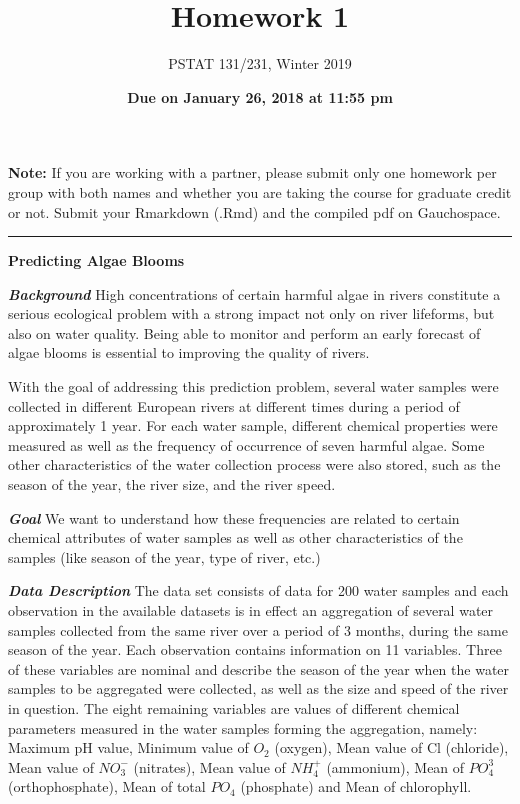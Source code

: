 \documentclass[]{article}
\title{Homework 1}
\author{PSTAT 131/231, Winter 2019}
\date{\textbf{Due on January 26, 2018 at 11:55 pm}}
\begin{document}
\maketitle

\textbf{Note:} If you are working with a partner, please submit only one
homework per group with both names and whether you are taking the course
for graduate credit or not. Submit your Rmarkdown (.Rmd) and the
compiled pdf on Gauchospace.

\begin{center}\rule{0.5\linewidth}{\linethickness}\end{center}

\textbf{Predicting Algae Blooms}

\textbf{\emph{Background}} High concentrations of certain harmful algae
in rivers constitute a serious ecological problem with a strong impact
not only on river lifeforms, but also on water quality. Being able to
monitor and perform an early forecast of algae blooms is essential to
improving the quality of rivers.

With the goal of addressing this prediction problem, several water
samples were collected in different European rivers at different times
during a period of approximately 1 year. For each water sample,
different chemical properties were measured as well as the frequency of
occurrence of seven harmful algae. Some other characteristics of the
water collection process were also stored, such as the season of the
year, the river size, and the river speed.

\textbf{\emph{Goal}} We want to understand how these frequencies are
related to certain chemical attributes of water samples as well as other
characteristics of the samples (like season of the year, type of river,
etc.)

\textbf{\emph{Data Description}} The data set consists of data for 200
water samples and each observation in the available datasets is in
effect an aggregation of several water samples collected from the same
river over a period of 3 months, during the same season of the year.
Each observation contains information on 11 variables. Three of these
variables are nominal and describe the season of the year when the water
samples to be aggregated were collected, as well as the size and speed
of the river in question. The eight remaining variables are values of
different chemical parameters measured in the water samples forming the
aggregation, namely: Maximum pH value, Minimum value of \(O_2\)
(oxygen), Mean value of Cl (chloride), Mean value of \(NO_3^-\)
(nitrates), Mean value of \(NH_4^+\) (ammonium), Mean of \(PO^{3}_4\)
(orthophosphate), Mean of total \(PO_4\) (phosphate) and Mean of
chlorophyll.
\end{document}
